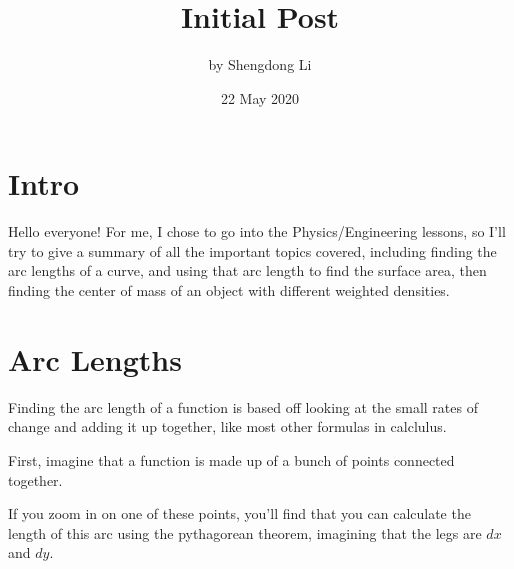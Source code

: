 \documentclass[letterpaper, 12pt]{article}
\begin{document}
\title{Initial Post}
\author{by Shengdong Li}
\date{22 May 2020}
\maketitle

\section{Intro}
Hello everyone! For me, I chose to go into the Physics/Engineering lessons, so I'll try to give a summary of all the important topics covered, including finding the arc lengths of a curve, and using that arc length to find the surface area, then finding the center of mass of an object with different weighted densities.

\section{Arc Lengths}
Finding the arc length of a function is based off looking at the small rates of change and adding it up together, like most other formulas in calclulus. \par
First, imagine that a function is made up of a bunch of points connected together.
\begin{center}
\end{center}
If you zoom in on one of these points, you'll find that you can calculate the length of this arc using the pythagorean theorem, imagining that the legs are $dx$ and $dy$.
\end{document}
